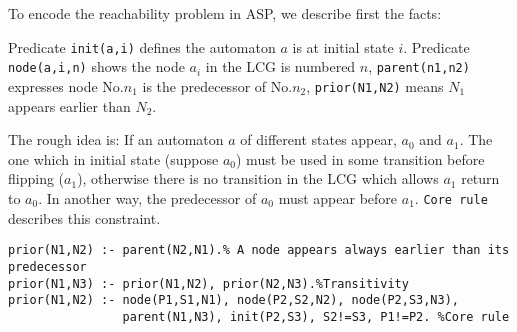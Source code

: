 \documentclass[en]{jdoc}
\begin{document}
To encode the reachability problem in ASP, we describe first the facts:

Predicate \texttt{init(a,i)} defines the automaton $a$ is at initial state $i$. %
Predicate \texttt{node(a,i,n)} shows the node $a_i$ in the LCG is numbered $n$, \texttt{parent(n1,n2)} expresses node No.$n_1$ is the predecessor of No.$n_2$, \texttt{prior(N1,N2)} means $N_1$ appears earlier than $N_2$.

The rough idea is: If an automaton $a$ of different states appear, $a_0$ and $a_1$. The one which in initial state (suppose $a_0$) must be used in some transition before flipping ($a_1$), otherwise there is no transition in the LCG which allows $a_1$ return to $a_0$. In another way, the predecessor of $a_0$ must appear before $a_1$. \texttt{Core rule} describes this constraint.

\begin{verbatim}
prior(N1,N2) :- parent(N2,N1).% A node appears always earlier than its predecessor
prior(N1,N3) :- prior(N1,N2), prior(N2,N3).%Transitivity
prior(N1,N2) :- node(P1,S1,N1), node(P2,S2,N2), node(P2,S3,N3), 
                parent(N1,N3), init(P2,S3), S2!=S3, P1!=P2. %Core rule
\end{verbatim}
\end{document}
